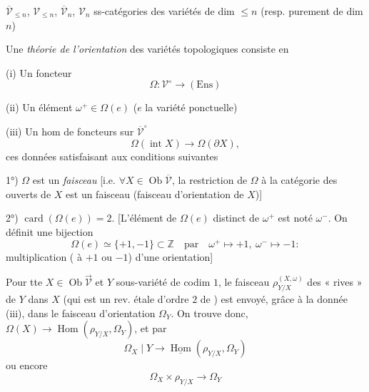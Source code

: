 \documentclass[11pt,a4paper]{article}
\begin{document}
$\overline{\mathcal{V}}_{\leq n}$, $\mathcal{V}_{\leq n}$, $\overline{\mathcal{V}}_{n}$, $\mathcal{V}_{n}$ ss-catégories des variétés de dim $\leq n$ (resp. purement de dim $n$)

Une \emph{théorie de l'orientation} des variétés topologiques consiste en

(i) Un foncteur
\[
  \Omega : \mathcal{V}^{\circ} \longrightarrow (\mathrm{Ens})
\]

(ii) Un  élément  $\omega^{+} \in \Omega(e)$ ($e$ la variété ponctuelle)

(iii) \struck{\ill{}} Un hom de foncteurs sur $\overline{\mathcal{V}}^{\circ}$
\[
  \Omega(\operatorname{int} X) \longrightarrow \Omega(\partial X),
\]
ces données satisfaisant aux conditions suivantes

1°) $\Omega$ est un \emph{faisceau} [i.e. $\forall X \in \operatorname{Ob} \overline{\mathcal{V}}$, la restriction  de $\Omega$ à la catégorie des ouverts de $X$ est un faisceau (faisceau d'orientation de $X$)]

2°) $\operatorname{card}(\Omega(e)) = 2$. [L'élément de $\Omega(e)$ distinct de $\omega^{+}$ est noté $\omega^{-}$. On définit une bijection
\[
  \Omega(e) \simeq \{+1, -1\} \subset \mathbb{Z} \quad\text{par}\quad \omega^{+} \mapsto +1,\ \omega^{-} \mapsto -1 :
\]
multiplication (\ill{} à $+1$ ou $-1$) d'une \ill{} orientation]


Pour tte $X \in \operatorname{Ob} \vec{\mathcal{V}}$ et $Y$ sous-variété de codim $1$, le faisceau $\rho^{(X,\omega)}_{Y/X}$ des « rives » de $Y$ dans $X$ (qui est un rev. étale d'ordre $2$ de ) est envoyé, grâce à la donnée (iii), dans le faisceau d'orientation $\Omega_{Y}$. On trouve donc,  $\Omega(X) \to \operatorname{Hom}(\rho_{Y/X}, \Omega_{Y})$, et par 
\[
  \Omega_{X} \mid Y \longrightarrow \underline{\operatorname{Hom}}(\rho_{Y/X}, \Omega_{Y})
\]
ou encore
\[
  \Omega_{X} \times \rho_{Y/X} \longrightarrow \Omega_{Y}
\]
\end{document}
